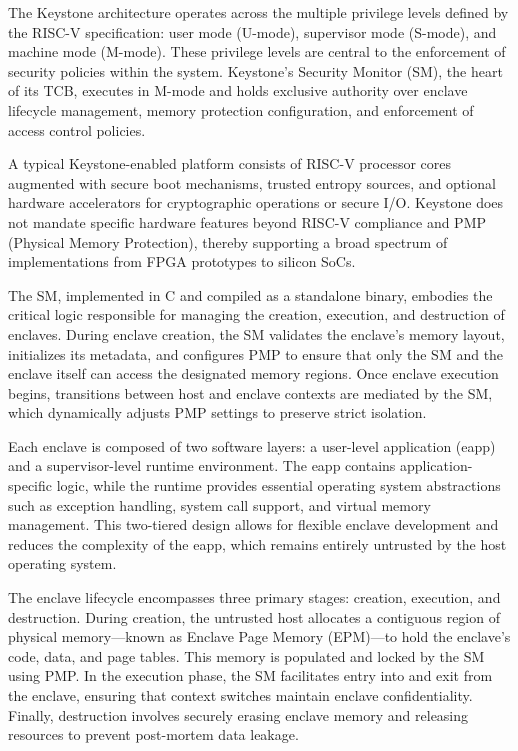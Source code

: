 The Keystone architecture operates across the multiple privilege levels defined by the RISC-V specification: user mode (U-mode), supervisor mode (S-mode), and machine mode (M-mode). These privilege levels are central to the enforcement of security policies within the system. Keystone's Security Monitor (SM), the heart of its TCB, executes in M-mode and holds exclusive authority over enclave lifecycle management, memory protection configuration, and enforcement of access control policies.

A typical Keystone-enabled platform consists of RISC-V processor cores augmented with secure boot mechanisms, trusted entropy sources, and optional hardware accelerators for cryptographic operations or secure I/O. Keystone does not mandate specific hardware features beyond RISC-V compliance and PMP (Physical Memory Protection), thereby supporting a broad spectrum of implementations from FPGA prototypes to silicon SoCs.

The SM, implemented in C and compiled as a standalone binary, embodies the critical logic responsible for managing the creation, execution, and destruction of enclaves. During enclave creation, the SM validates the enclave's memory layout, initializes its metadata, and configures PMP to ensure that only the SM and the enclave itself can access the designated memory regions. Once enclave execution begins, transitions between host and enclave contexts are mediated by the SM, which dynamically adjusts PMP settings to preserve strict isolation.

Each enclave is composed of two software layers: a user-level application (eapp) and a supervisor-level runtime environment. The eapp contains application-specific logic, while the runtime provides essential operating system abstractions such as exception handling, system call support, and virtual memory management. This two-tiered design allows for flexible enclave development and reduces the complexity of the eapp, which remains entirely untrusted by the host operating system.

The enclave lifecycle encompasses three primary stages: creation, execution, and destruction. During creation, the untrusted host allocates a contiguous region of physical memory—known as Enclave Page Memory (EPM)—to hold the enclave’s code, data, and page tables. This memory is populated and locked by the SM using PMP. In the execution phase, the SM facilitates entry into and exit from the enclave, ensuring that context switches maintain enclave confidentiality. Finally, destruction involves securely erasing enclave memory and releasing resources to prevent post-mortem data leakage.

